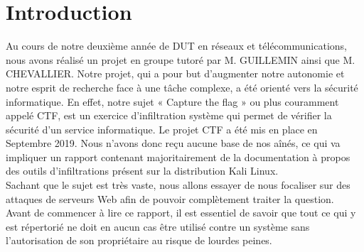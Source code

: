 \chapter*{Introduction}
\label{chap:Mini Projet}
\label{sec:conclusion}
Au cours de notre deuxième année de DUT en réseaux et télécommunications, nous avons réalisé un projet en groupe tutoré par M. GUILLEMIN ainsi que M. CHEVALLIER. Notre projet, qui a pour but d’augmenter notre autonomie et notre esprit de recherche face à une tâche complexe, a été orienté vers la sécurité informatique. En effet, notre sujet « Capture the flag » ou plus couramment appelé CTF, est un exercice d’infiltration système qui permet de vérifier la sécurité d’un service informatique. Le projet CTF a été mis en place en Septembre 2019. Nous n’avons donc reçu aucune base de nos aînés, ce qui va impliquer un rapport contenant majoritairement de la documentation à propos des outils d’infiltrations présent sur la distribution Kali Linux.\\
Sachant que le sujet est très vaste, nous allons essayer de nous focaliser sur des attaques de serveurs Web afin de pouvoir complètement traiter la question.\\

Avant de commencer à lire ce rapport, il est essentiel de savoir que tout ce qui y est répertorié ne doit en aucun cas être utilisé contre un système sans l’autorisation de son propriétaire au risque de lourdes peines.




